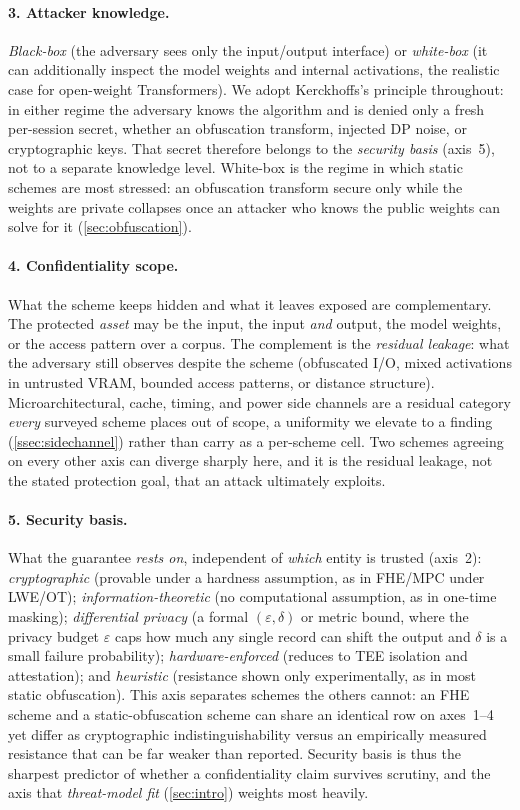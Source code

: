 \paragraph{3. Attacker knowledge.}
\emph{Black-box} (the adversary sees only the input/output interface) or \emph{white-box}
(it can additionally inspect the model weights and internal activations, the realistic case
for open-weight Transformers). We adopt Kerckhoffs's principle throughout: in either regime the
adversary knows the algorithm and is denied only a fresh per-session secret, whether an
obfuscation transform, injected DP noise, or cryptographic keys. That secret therefore belongs
to the \emph{security basis} (axis~5), not to a separate knowledge level. White-box is the
regime in which static schemes are most stressed: an obfuscation transform secure only while the
weights are private collapses once an attacker who knows the public weights can solve for it
(\cref{sec:obfuscation}).

\paragraph{4. Confidentiality scope.}
What the scheme keeps hidden and what it leaves exposed are complementary. The protected
\emph{asset} may be the input, the input \emph{and} output, the model weights, or the access
pattern over a corpus. The complement is the \emph{residual leakage}: what the adversary still
observes despite the scheme (obfuscated I/O, mixed activations in untrusted VRAM, bounded
access patterns, or distance structure). Microarchitectural, cache, timing, and power side
channels are a residual category \emph{every} surveyed scheme places out of scope, a
uniformity we elevate to a finding (\cref{ssec:sidechannel}) rather than carry as a per-scheme
cell. Two schemes agreeing on every other axis can diverge sharply here, and it is the residual
leakage, not the stated protection goal, that an attack ultimately exploits.

\paragraph{5. Security basis.}
What the guarantee \emph{rests on}, independent of \emph{which} entity is trusted (axis~2):
\emph{cryptographic} (provable under a hardness assumption, as in FHE/MPC under LWE/OT);
\emph{information-theoretic} (no computational assumption, as in one-time masking);
\emph{differential privacy} (a formal $(\varepsilon,\delta)$ or metric bound, where the privacy
budget $\varepsilon$ caps how much any single record can shift the output and $\delta$ is a small
failure probability);
\emph{hardware-enforced} (reduces to TEE isolation and attestation); and \emph{heuristic}
(resistance shown only experimentally, as in most static obfuscation). This axis separates
schemes the others cannot: an FHE scheme and a static-obfuscation scheme can share an identical
row on axes~1--4 yet differ as cryptographic indistinguishability versus an empirically
measured resistance that can be far weaker than reported. Security basis is thus the sharpest
predictor of whether a confidentiality claim
survives scrutiny, and the axis that \emph{threat-model fit} (\cref{sec:intro}) weights most heavily.

